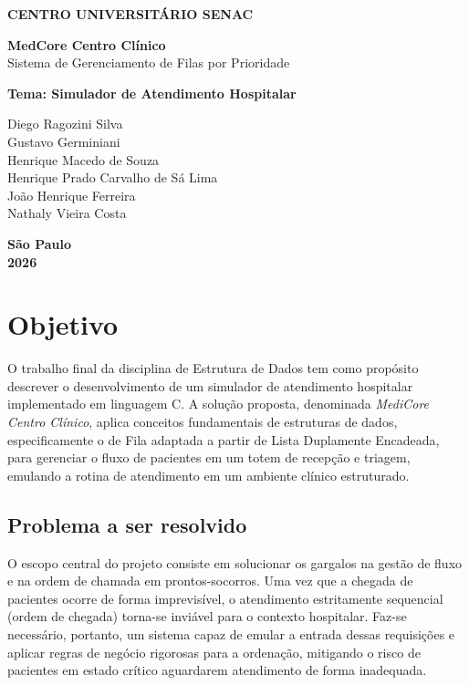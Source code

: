 \documentclass[12pt,a4paper]{article}
\begin{document}
\begin{titlepage}
    \begin{center}
        \fontsize{12pt}{14pt}\selectfont
        \textbf{CENTRO UNIVERSITÁRIO SENAC}\\
        \vspace{4.5cm}

        \fontsize{14pt}{17pt}\selectfont
        \textbf{MedCore Centro Clínico}\\
        Sistema de Gerenciamento de Filas por Prioridade\\
        \vspace{1.5cm}

        \fontsize{12pt}{14pt}\selectfont
        \textbf{Tema: Simulador de Atendimento Hospitalar}\\
        \vspace{4.5cm}

        \vspace{0.5cm}
        Diego Ragozini Silva\\
        Gustavo Germiniani\\
        Henrique Macedo de Souza\\
        Henrique Prado Carvalho de Sá Lima\\
        João Henrique Ferreira\\
        Nathaly Vieira Costa\\

        \vfill

        \textbf{São Paulo}\\
        \textbf{2026}
    \end{center}
\end{titlepage}

\newpage
\tableofcontents
\newpage

\section{Objetivo}
\label{sec:objetivo}
O trabalho final da disciplina de Estrutura de Dados tem como propósito descrever o desenvolvimento de um simulador de atendimento hospitalar implementado em linguagem C. A solução proposta, denominada \textit{MediCore Centro Clínico}, aplica conceitos fundamentais de estruturas de dados, especificamente o de Fila adaptada a partir de Lista Duplamente Encadeada, para gerenciar o fluxo de pacientes em um totem de recepção e triagem, emulando a rotina de atendimento em um ambiente clínico estruturado.

\subsection{Problema a ser resolvido}
O escopo central do projeto consiste em solucionar os gargalos na gestão de fluxo e na ordem de chamada em prontos-socorros. Uma vez que a chegada de pacientes ocorre de forma imprevisível, o atendimento estritamente sequencial (ordem de chegada) torna-se inviável para o contexto hospitalar. Faz-se necessário, portanto, um sistema capaz de emular a entrada dessas requisições e aplicar regras de negócio rigorosas para a ordenação, mitigando o risco de pacientes em estado crítico aguardarem atendimento de forma inadequada.
\end{document}
